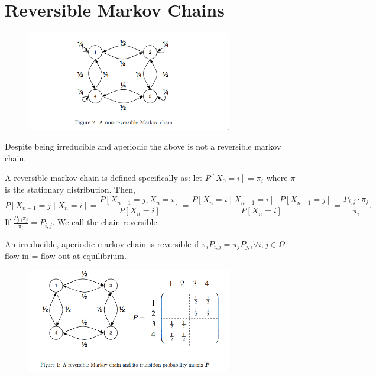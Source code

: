 \documentclass[a4paper]{article}
\begin{document}
\section{Reversible Markov Chains}

\begin{figure}[h]
  \centering
  \includegraphics[width=0.8\textwidth]{assets/non_reversible_markov_chain.png}
  \label{fig:non_reversible_markov_chain}
\end{figure}
\begin{note}
  Despite being irreducible and aperiodic the above is not a reversible markov chain. 
\end{note}

\begin{definition}
  A reversible markov chain is defined specifically as: let $P[X_0 = i] = \pi_i$ where $\pi$ is the stationary distribution. Then,
  \[
    P[X_{n-1}=j\mid X_n = i] = \frac{P[X_{n-1}=j , X_n = i]}{P[X_n=i]} = \frac{P[X_n = i \mid  X_{n-1} = i] \cdot P[X_{n-1}=j]}{P[X_n = i]} = \frac{P_{i,j} \cdot \pi_j}{\pi_i} 
  .\] 
  If $\frac{P_{j,i} \pi_j}{\pi_i} = P_{i,j}$. We call the chain reversible.  
\end{definition}

\begin{corollary}
  An irreducible, aperiodic markov chain is reversible if $\pi_i P_{i,j} = \pi_j P_{j,i} \forall i,j \in \Omega$. flow in = flow out at equilibrium.
\end{corollary}


\begin{figure}[h]
  \centering
  \includegraphics[width=0.8\textwidth]{assets/reversible_markov_chain_ex.png}
  \label{fig:reversible_markov_chain_ex}
\end{figure}
\end{document}
